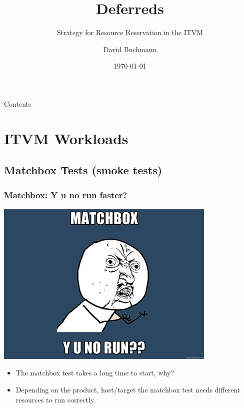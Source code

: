 \documentclass[xcolor=pdftex,dvipsnames,table]{beamer}
\title{Deferreds}
\subtitle{Strategy for Resource Reservation in the ITVM}
\author{David Buchmann}
\institute{Cisco Systems}
\date{\today}
\begin{document}
\maketitle

\begin{frame}[allowframebreaks]{Contents}
  \tableofcontents
\end{frame}

\section{ITVM Workloads}
\subsection{Matchbox Tests (smoke tests)}
\begin{frame}

  \frametitle{Matchbox: Y u no run faster?}
  \includegraphics[scale=0.33]{matchbox.jpg}
  \begin{itemize}
    \item The matchbox test takes a long time to start, why?
    \item Depending on the product, host/target the matchbox test
      needs different resources to run correctly.
  \end{itemize}
\end{frame}
\end{document}
